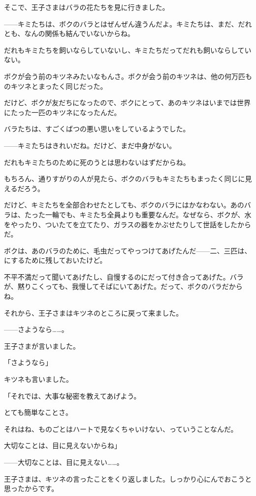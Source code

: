 そこで、王子さまはバラの花たちを見に行きました。

——キミたちは、ボクのバラとはぜんぜん違うんだよ。キミたちは、まだ、だれとも、なんの関係も結んでいないからね。

だれもキミたちを飼いならしていないし、キミたちだってだれも飼いならしていない。

ボクが会う前のキツネみたいなもんさ。ボクが会う前のキツネは、他の何万匹ものキツネとまったく同じだった。

だけど、ボクが友だちになったので、ボクにとって、あのキツネはいまでは世界にたった一匹のキツネになったんだ。

バラたちは、すごくばつの悪い思いをしているようでした。

——キミたちはきれいだね。だけど、まだ中身がない。

だれもキミたちのために死のうとは思わないはずだからね。

もちろん、通りすがりの人が見たら、ボクのバラもキミたちもまったく同じに見えるだろう。

だけど、キミたちを全部合わせたとしても、ボクのバラにはかなわない。あのバラは、たった一輪でも、キミたち全員よりも重要なんだ。なぜなら、ボクが、水をやったり、ついたてを立てたり、ガラスの器をかぶせたりして世話をしたからだ。

ボクは、あのバラのために、毛虫だってやっつけてあげたんだ——二、三匹は、にするために残しておいたけど。

不平不満だって聞いてあげたし、自慢するのにだって付き合ってあげた。バラが、黙りこくっても、我慢してそばにいてあげた。だって、ボクのバラだからね。

それから、王子さまはキツネのところに戻って来ました。


——さようなら……。

王子さまが言いました。

「さようなら」

キツネも言いました。

「それでは、大事な秘密を教えてあげよう。

とても簡単なことさ。

それはね、ものごとはハートで見なくちゃいけない、っていうことなんだ。

大切なことは、目に見えないからね」

——大切なことは、目に見えない……。

王子さまは、キツネの言ったことをくり返しました。しっかり心にんでおこうと思ったからです。

